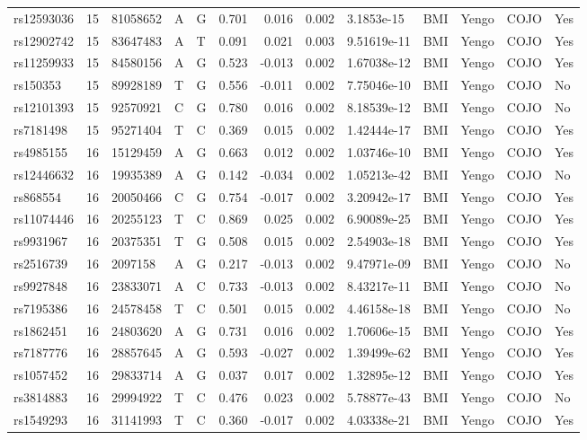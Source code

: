 \documentclass[11pt,twoside]{bristolthesis}
\begin{document}
\begin{longtable}[t]{lrlllrrrlllll}
rs12593036 & 15 & 81058652 & A & G & 0.701 & 0.016 & 0.002 & 3.1853e-15 & BMI & Yengo & COJO & Yes\\
rs12902742 & 15 & 83647483 & A & T & 0.091 & 0.021 & 0.003 & 9.51619e-11 & BMI & Yengo & COJO & Yes\\
rs11259933 & 15 & 84580156 & A & G & 0.523 & -0.013 & 0.002 & 1.67038e-12 & BMI & Yengo & COJO & Yes\\
\addlinespace
rs150353 & 15 & 89928189 & T & G & 0.556 & -0.011 & 0.002 & 7.75046e-10 & BMI & Yengo & COJO & No\\
rs12101393 & 15 & 92570921 & C & G & 0.780 & 0.016 & 0.002 & 8.18539e-12 & BMI & Yengo & COJO & No\\
rs7181498 & 15 & 95271404 & T & C & 0.369 & 0.015 & 0.002 & 1.42444e-17 & BMI & Yengo & COJO & Yes\\
rs4985155 & 16 & 15129459 & A & G & 0.663 & 0.012 & 0.002 & 1.03746e-10 & BMI & Yengo & COJO & Yes\\
rs12446632 & 16 & 19935389 & A & G & 0.142 & -0.034 & 0.002 & 1.05213e-42 & BMI & Yengo & COJO & No\\
\addlinespace
rs868554 & 16 & 20050466 & C & G & 0.754 & -0.017 & 0.002 & 3.20942e-17 & BMI & Yengo & COJO & Yes\\
rs11074446 & 16 & 20255123 & T & C & 0.869 & 0.025 & 0.002 & 6.90089e-25 & BMI & Yengo & COJO & Yes\\
rs9931967 & 16 & 20375351 & T & G & 0.508 & 0.015 & 0.002 & 2.54903e-18 & BMI & Yengo & COJO & Yes\\
rs2516739 & 16 & 2097158 & A & G & 0.217 & -0.013 & 0.002 & 9.47971e-09 & BMI & Yengo & COJO & No\\
rs9927848 & 16 & 23833071 & A & C & 0.733 & -0.013 & 0.002 & 8.43217e-11 & BMI & Yengo & COJO & No\\
\addlinespace
rs7195386 & 16 & 24578458 & T & C & 0.501 & 0.015 & 0.002 & 4.46158e-18 & BMI & Yengo & COJO & No\\
rs1862451 & 16 & 24803620 & A & G & 0.731 & 0.016 & 0.002 & 1.70606e-15 & BMI & Yengo & COJO & Yes\\
rs7187776 & 16 & 28857645 & A & G & 0.593 & -0.027 & 0.002 & 1.39499e-62 & BMI & Yengo & COJO & Yes\\
rs1057452 & 16 & 29833714 & A & G & 0.037 & 0.017 & 0.002 & 1.32895e-12 & BMI & Yengo & COJO & Yes\\
rs3814883 & 16 & 29994922 & T & C & 0.476 & 0.023 & 0.002 & 5.78877e-43 & BMI & Yengo & COJO & No\\
\addlinespace
rs1549293 & 16 & 31141993 & T & C & 0.360 & -0.017 & 0.002 & 4.03338e-21 & BMI & Yengo & COJO & Yes\\

\end{longtable}
\end{document}

